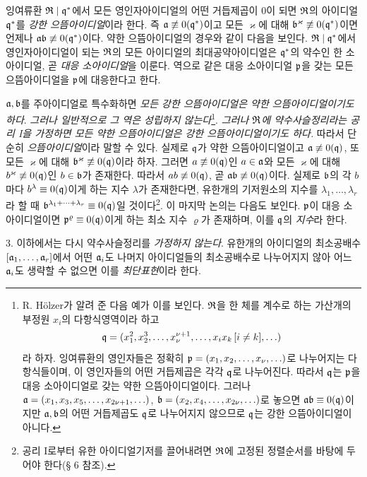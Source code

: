 잉여류환 \(\mathfrak{R}\mid\mathfrak{q}^*\)에서 모든 영인자아이디얼의 어떤 거듭제곱이 0이 되면 \(\mathfrak{R}\)의 아이디얼 \(\mathfrak{q}^*\)를 \emph{강한 으뜸아이디얼}이라 한다. 즉 \(\mathfrak{a}\not\equiv0(\mathfrak{q}^*)\)이고 모든 \(\varkappa\)에 대해 \(\mathfrak{b}^\varkappa\not\equiv0(\mathfrak{q}^*)\)이면 언제나 \(\mathfrak{a}\mathfrak{b}\not\equiv0(\mathfrak{q}^*)\)이다. 약한 으뜸아이디얼의 경우와 같이 다음을 보인다. \(\mathfrak{R}\mid\mathfrak{q}^*\)에서 영인자아이디얼이 되는 \(\mathfrak{R}\)의 모든 아이디얼의 최대공약아이디얼은 \(\mathfrak{q}^*\)의 약수인 한 소아이디얼, 곧 \emph{대응 소아이디얼}을 이룬다. 역으로 같은 대응 소아이디얼 \(\mathfrak{p}\)을 갖는 모든 으뜸아이디얼을 \glqq{}\(\mathfrak{p}\)에 대응한다\grqq{}고 한다.

\(\mathfrak{a},\mathfrak{b}\)를 주아이디얼로 특수화하면 \emph{모든 강한 으뜸아이디얼은 약한 으뜸아이디얼이기도 하다}. \emph{그러나 일반적으로 그 역은 성립하지 않는다}\footnote{R. Hölzer가 알려 준 다음 예가 이를 보인다. \(\mathfrak{R}\)을 한 체를 계수로 하는 가산개의 부정원 \(x_i\)의 다항식영역이라 하고
\[
\mathfrak{q}=(x_1^2,x_2^3,\ldots,x_\nu^{\nu+1},\ldots,x_i x_k\,[i\ne k],\ldots)
\]
라 하자. 잉여류환의 영인자들은 정확히 \(\mathfrak{p}=(x_1,x_2,\ldots,x_\nu,\ldots)\)로 나누어지는 다항식들이며, 이 영인자들의 어떤 거듭제곱은 각각 \(\mathfrak{q}\)로 나누어진다. 따라서 \(\mathfrak{q}\)는 \(\mathfrak{p}\)을 대응 소아이디얼로 갖는 약한 으뜸아이디얼이다. 그러나 \(\mathfrak{a}=(x_1,x_3,x_5,\ldots,x_{2\nu+1},\ldots)\), \(\mathfrak{b}=(x_2,x_4,\ldots,x_{2\nu},\ldots)\)로 놓으면 \(\mathfrak{a}\mathfrak{b}\equiv0(\mathfrak{q})\)이지만 \(\mathfrak{a},\mathfrak{b}\)의 어떤 거듭제곱도 \(\mathfrak{q}\)로 나누어지지 않으므로 \(\mathfrak{q}\)는 강한 으뜸아이디얼이 아니다.}. \emph{그러나 \(\mathfrak{R}\)에 약수사슬정리라는 공리 I을 가정하면 모든 약한 으뜸아이디얼은 강한 으뜸아이디얼이기도 하다.} 따라서 단순히 \emph{으뜸아이디얼}이라 말할 수 있다. 실제로 \(\mathfrak{q}\)가 약한 으뜸아이디얼이고 \(\mathfrak{a}\not\equiv0(\mathfrak{q})\), 또 모든 \(\varkappa\)에 대해 \(\mathfrak{b}^\varkappa\not\equiv0(\mathfrak{q})\)이라 하자. 그러면 \(a\not\equiv0(\mathfrak{q})\)인 \(a\in\mathfrak{a}\)와 모든 \(\varkappa\)에 대해 \(b^\varkappa\not\equiv0(\mathfrak{q})\)인 \(b\in\mathfrak{b}\)가 존재한다. 따라서 \(ab\not\equiv0(\mathfrak{q})\), 곧 \(\mathfrak{a}\mathfrak{b}\not\equiv0(\mathfrak{q})\)이다. 실제로 \(\mathfrak{b}\)의 각 \(b\)마다 \(b^\lambda\equiv0(\mathfrak{q})\)이게 하는 지수 \(\lambda\)가 존재한다면, 유한개의 기저원소의 지수를 \(\lambda_1,\ldots,\lambda_r\)라 할 때 \(\mathfrak{b}^{\lambda_1+\cdots+\lambda_r}\equiv0(\mathfrak{q})\)일 것이다\footnote{공리 I로부터 유한 아이디얼기저를 끌어내려면 \(\mathfrak{R}\)에 고정된 정렬순서를 바탕에 두어야 한다(§ 6 참조).}. 이 마지막 논의는 다음도 보인다. \(\mathfrak{p}\)이 대응 소아이디얼이면 \(\mathfrak{p}^\varrho\equiv0(\mathfrak{q})\)이게 하는 최소 지수 \(\varrho\)가 존재하며, 이를 \(\mathfrak{q}\)의 \emph{지수}라 한다.

3. 이하에서는 다시 약수사슬정리를 \emph{가정하지 않는다}. 유한개의 아이디얼의 최소공배수 \([\mathfrak{a}_1,\ldots,\mathfrak{a}_r]\)에서 어떤 \(\mathfrak{a}_i\)도 나머지 아이디얼들의 최소공배수로 나누어지지 않아 어느 \(\mathfrak{a}_i\)도 생략할 수 없으면 이를 \emph{최단표현}이라 한다.

